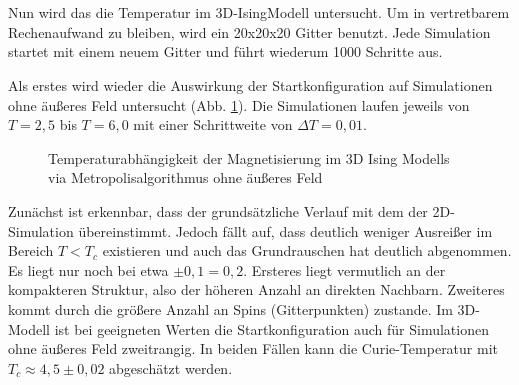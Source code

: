 \

\

Nun wird das die Temperatur im 3D-IsingModell untersucht. Um in vertretbarem Rechenaufwand zu bleiben, wird ein 20x20x20 Gitter benutzt. Jede Simulation startet mit einem neuem Gitter und führt wiederum 1000 Schritte aus.


Als erstes wird wieder die Auswirkung der Startkonfiguration auf Simulationen ohne äußeres Feld untersucht (Abb. \ref{mp3d0modes}). Die Simulationen laufen jeweils von $T=2,5$ bis $T=6,0$ mit einer Schrittweite von $\Delta T= 0,01$.
\begin{figure}[H]
	\centering
	\caption{Temperaturabhängigkeit der Magnetisierung im 3D Ising Modells via Metropolisalgorithmus ohne äußeres Feld}
	\label{mp3d0modes}
\end{figure}
Zunächst ist erkennbar, dass der grundsätzliche Verlauf mit dem der 2D-Simulation übereinstimmt. Jedoch fällt auf, dass deutlich weniger Ausreißer im Bereich $T<T_{c}$ existieren und auch das Grundrauschen hat deutlich abgenommen. Es liegt nur noch bei etwa $\pm 0,1 = 0,2$. Ersteres liegt vermutlich an der kompakteren Struktur, also der höheren Anzahl an direkten Nachbarn. Zweiteres kommt durch die größere Anzahl an Spins (Gitterpunkten) zustande. Im 3D-Modell ist bei geeigneten Werten die Startkonfiguration auch für Simulationen ohne äußeres Feld zweitrangig. In beiden Fällen kann die Curie-Temperatur mit $T_{c}\approx 4,5\pm 0,02$ abgeschätzt werden.


